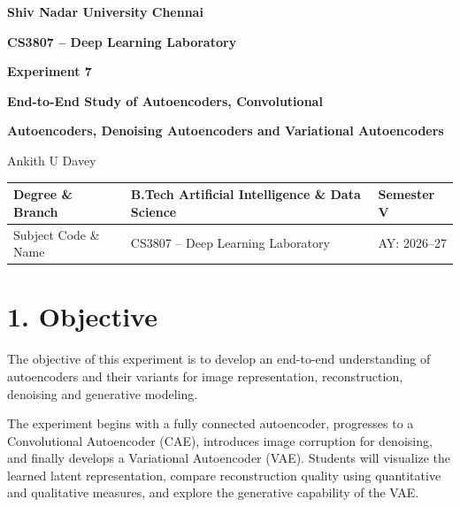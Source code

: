 \documentclass[10pt]{article}
\begin{document}

\begin{center}

{\large\textbf{Shiv Nadar University Chennai}}

\vspace{2mm}

{\normalsize\textbf{CS3807 -- Deep Learning Laboratory}}

\vspace{2mm}

{\large\textbf{Experiment 7}}

\vspace{1mm}

{\normalsize\textbf{End-to-End Study of Autoencoders, Convolutional}}

{\normalsize\textbf{Autoencoders, Denoising Autoencoders and Variational Autoencoders}}

\vspace{2mm}

{\normalsize Ankith U Davey }

\end{center}

\vspace{3mm}

\begin{tabular}{|p{3.4cm}|p{9.0cm}|p{1.4cm}|}
\hline
Degree \& Branch &
B.Tech Artificial Intelligence \& Data Science &
Semester V\\
\hline
Subject Code \& Name &
CS3807 -- Deep Learning Laboratory &
AY: 2026--27\\
\hline
\end{tabular}

\section*{1. Objective}

The objective of this experiment is to develop an end-to-end understanding of
autoencoders and their variants for image representation, reconstruction,
denoising and generative modeling.

The experiment begins with a fully connected autoencoder, progresses to a
Convolutional Autoencoder (CAE), introduces image corruption for denoising,
and finally develops a Variational Autoencoder (VAE). Students will visualize
the learned latent representation, compare reconstruction quality using
quantitative and qualitative measures, and explore the generative capability
of the VAE.
\end{document}

